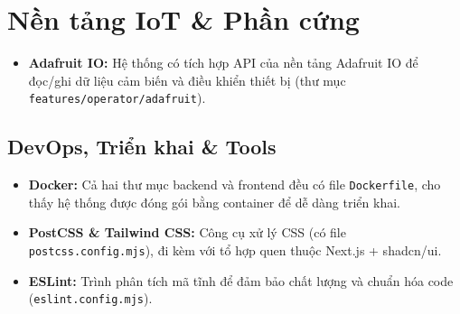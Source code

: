 \section{Nền tảng IoT \& Phần cứng}
\begin{itemize}
    \item \textbf{Adafruit IO:} Hệ thống có tích hợp API của nền tảng Adafruit IO để đọc/ghi dữ liệu cảm biến và điều khiển thiết bị (thư mục \texttt{features/operator/adafruit}).
\end{itemize}

\subsection{DevOps, Triển khai \& Tools}
\begin{itemize}
    \item \textbf{Docker:} Cả hai thư mục backend và frontend đều có file \texttt{Dockerfile}, cho thấy hệ thống được đóng gói bằng container để dễ dàng triển khai.
    \item \textbf{PostCSS \& Tailwind CSS:} Công cụ xử lý CSS (có file \texttt{postcss.config.mjs}), đi kèm với tổ hợp quen thuộc Next.js + shadcn/ui.
    \item \textbf{ESLint:} Trình phân tích mã tĩnh để đảm bảo chất lượng và chuẩn hóa code (\texttt{eslint.config.mjs}).
\end{itemize}
